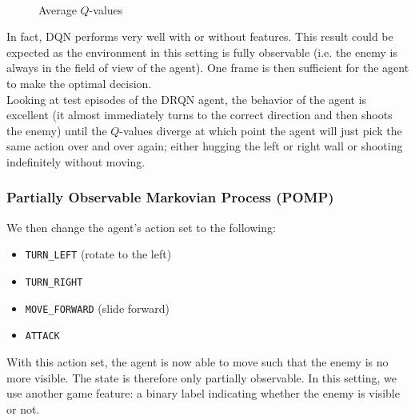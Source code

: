 \documentclass[letterpaper]{article}
\begin{document}
\begin{figure}
	\\
	\caption{Average $Q$-values}
	\label{averageq}
\end{figure}

In fact, DQN performs very well with or without features. This result could
be expected as the environment in this setting is fully observable (i.e.
the enemy is always in the field of view of the agent). One frame is then
sufficient for the agent to make the optimal decision.\\

Looking at test episodes of the DRQN agent, the behavior of the agent is excellent
(it almost
immediately turns to the correct direction and then shoots the enemy) until the
$Q$-values diverge at which point the agent will just pick the same action
over and over again; either hugging the left or right wall or shooting
indefinitely without moving.\\

\subsubsection{Partially Observable Markovian Process (POMP)}
We then change the agent's action set to the following:
\begin{itemize}
  \item \texttt{TURN\_LEFT} (rotate to the left)
  \item \texttt{TURN\_RIGHT}
  \item \texttt{MOVE\_FORWARD} (slide forward)
  \item \texttt{ATTACK}
\end{itemize}
With this action set, the agent is now able to move such that the enemy is no
more visible. The state is therefore only partially observable. In this setting,
we use another game feature: a binary label indicating whether the enemy is visible
or not. 
\end{document}
